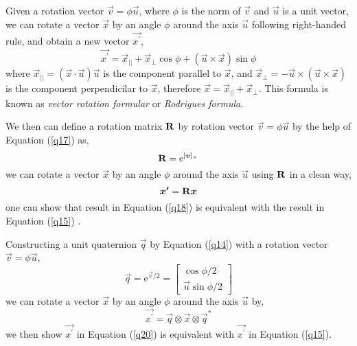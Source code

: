 Given a rotation vector $\vec{v} = \phi\vec{u}$, where $\phi$ is the norm of $\vec{v}$ and $\vec{u}$ is a unit vector, we can rotate a vector $\vec{x}$ by an angle $\phi$ around the axis $\vec{u}$ following right-handed rule, and obtain a new vector $\vec{x^{\prime}}$,
\begin{equation}\label{q15}
	\vec{x^{\prime}} = \vec{x}_{||} + \vec{x}_{\bot}\cos{\phi} + (\vec{u} \times \vec{x})\sin{\phi}
\end{equation}
where $\vec{x}_{||} = (\vec{x} \cdot \vec{u})\vec{u}$ is the component parallel to $\vec{x}$, and $\vec{x}_{\bot} = -\vec{u} \times (\vec{u} \times \vec{x})$ is the component perpendicilar to $\vec{x}$, therefore $\vec{x} = \vec{x}_{||} + \vec{x}_{\bot}$. This formula is known as \textit{vector rotation formular} or \textit{Rodrigues formula}.

We then can define a rotation matrix $\mathbf{R}$ by rotation vector $\vec{v} = \phi\vec{u}$ by the help of Equation (\ref{q17}) as,
\begin{equation}\label{q16}
	\mathbf{R} = \mathrm{e}^{[\boldsymbol{v}]_\times}
\end{equation}
we can rotate a vector $\vec{x}$ by an angle $\phi$ around the axis $\vec{u}$ using $\mathbf{R}$ in a clean way,
\begin{equation}\label{q18}
	\boldsymbol{x^{\prime}} = \mathbf{R}\boldsymbol{x}
\end{equation}
one can show that result in Equation (\ref{q18}) is equivalent with the result in Equation (\ref{q15}) \cite{wiki:rotationformula}. 

Constructing a unit quaternion $\vec{q}$ by Equation (\ref{q14}) with a rotation vector $\vec{v} = \phi\vec{u}$, 
\begin{equation}\label{q19}
	\vec{q} = \mathrm{e}^{\vec{v}/2} = \begin{bmatrix}
											\cos{\phi / 2}  \\ \vec{u}\sin{\phi / 2} 
									  \end{bmatrix}
\end{equation}
we can rotate a vector $\vec{x}$ by an angle $\phi$ around the axis $\vec{u}$ by,
\begin{equation}\label{q20}
	\vec{x^{\prime}} = \vec{q} \otimes \vec{x} \otimes \vec{q}^{*}
\end{equation}
we then show $\vec{x^{\prime}}$ in Equation (\ref{q20}) is equivalent with $\vec{x^{\prime}}$ in Equation (\ref{q15}).

